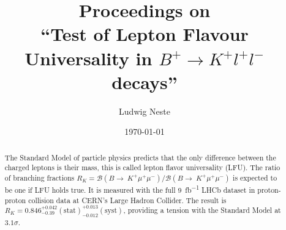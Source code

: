 \documentclass[%
 reprint,
 amsmath,amssymb,
 aps,
]{revtex4-2}
\begin{document}
\title{Proceedings on \\ \enquote{Test of Lepton Flavour Universality in $B^+\to K^+l^+l^- $ decays}}

\author{Ludwig Neste}
\date{\today}%

\begin{abstract}
	The Standard Model of particle physics predicts that the only difference between the charged leptons 
	is their mass, this is called lepton flavor universality (LFU). 
	The ratio of branching fractions $R_K=\mathcal{B}(B\to~K^+\mu^+\mu^-)/\mathcal{B}(B\to~K^+\mu^+\mu^-)$
	is expected to be one if LFU holds true. 
	It is measured with the full \SI{9}{\femto\barn\tothe{-1}} LHCb dataset in proton-proton collision data 
	at CERN's Large Hadron Collider. The result is $R_K=\num{0.846}_{-0.39}^{+0.042}(\text{stat})_{-0.012}^{+0.013}(\text{syst})$,
	providing a tension with the Standard Model at $3.1\sigma$.
\end{abstract}

\maketitle





\end{document}
